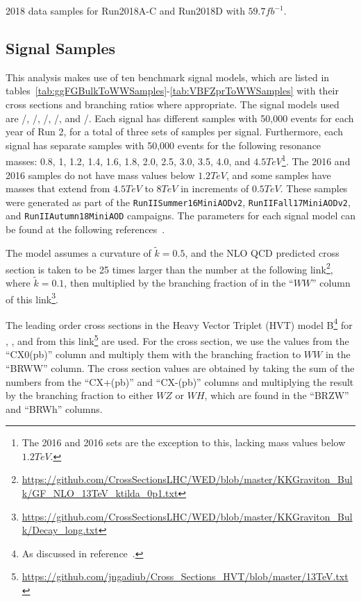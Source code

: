\begin{table}[htbp]
  \centering
  
  \caption{
    2018 data samples for Run2018A-C and Run2018D with $59.7\unit{fb^{-1}}$.
  }
  \label{tab:dataSamples2018}
\end{table}

\subsection{Signal Samples}
\label{sec:sigSamples}

This analysis makes use of ten benchmark signal models, which are listed in tables~\ref{tab:ggFGBulkToWWSamples}-\ref{tab:VBFZprToWWSamples} with their cross sections and branching ratios where appropriate.
The signal models used are \ggF/\VBF\GBulktoWWtolnuqqbarpr, \ggF/\VBF\RadtoWWtolnuqqbarpr, \DY/\VBF\WprtoWZtolnuqqbar, \DY/\VBF\WprtoWHtolnubbbar, and \DY/\VBF\ZprtoWWtolnuqqbarpr.
Each signal has different samples with 50,000 events for each year of Run 2, for a total of three sets of samples per signal.
Furthermore, each signal has separate samples with 50,000 events for the following resonance masses: 0.8, 1, 1.2, 1.4, 1.6, 1.8, 2.0, 2.5, 3.0, 3.5, 4.0, and $4.5\unit{TeV}$\footnote{The 2016 \VBF\ZprtoWW and 2016 \VBF\WprtoWZ sets are the exception to this, lacking mass values below $1.2\unit{TeV}$.}.
The 2016 \VBF\ZprtoWW and 2016 \VBF\WprtoWZ samples do not have mass values below $1.2\unit{TeV}$, and some samples have masses that extend from $4.5\unit{TeV}$ to $8\unit{TeV}$ in increments of $0.5\unit{TeV}$.
These samples were generated as part of the \texttt{RunIISummer16MiniAODv2}, \texttt{RunIIFall17MiniAODv2}, and \texttt{RunIIAutumn18MiniAOD} campaigns.
The parameters for each signal model can be found at the following references~\cite{git:BulkGrav_WW,git:Wpr_WZ,git:Wpr_WH,git:VBFRad_WW}.

The \ggF\GBulktoWW model assumes a curvature of $\tilde{k}=0.5$, and the NLO QCD predicted cross section is taken to be 25 times larger than the number at the following link\footnote{\url{https://github.com/CrossSectionsLHC/WED/blob/master/KKGraviton\_Bulk/GF\_NLO\_13TeV\_ktilda_0p1.txt}}, where $\tilde{k}=0.1$, then multiplied by the branching fraction of \GBulktoWW in the ``$WW$'' column of this link\footnote{\url{https://github.com/CrossSectionsLHC/WED/blob/master/KKGraviton\_Bulk/Decay\_long.txt}}. %

The leading order cross sections in the Heavy Vector Triplet (HVT) model B\footnote{As discussed in reference~\cite{Pappadopulo_2014}.} for \DY\ZprtoWW, \DY\WprtoWZ, and \DY\WprtoWH from this link\footnote{\url{https://github.com/jngadiub/Cross\_Sections\_HVT/blob/master/13TeV.txt}} are used. %
For the \Zpr cross section, we use the values from the ``CX0(pb)'' column and multiply them with the branching fraction to $WW$ in the ``BRWW'' column.
The \Wpr cross section values are obtained by taking the sum of the numbers from the ``CX+(pb)'' and ``CX-(pb)'' columns and multiplying the result by the branching fraction to either $WZ$ or $WH$, which are found in the ``BRZW'' and ``BRWh'' columns.

